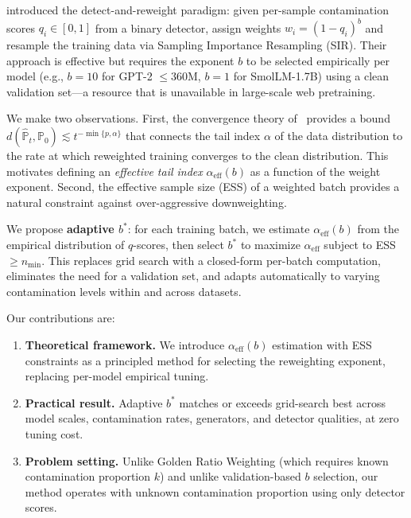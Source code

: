 \documentclass[11pt]{article}
\begin{document}
\citet{drayson2025contamination} introduced the detect-and-reweight paradigm: given per-sample contamination scores $q_i \in [0,1]$ from a binary detector, assign weights $w_i = (1-q_i)^b$ and resample the training data via Sampling Importance Resampling (SIR). Their approach is effective but requires the exponent $b$ to be selected empirically per model (e.g., $b=10$ for GPT-2 $\leq$360M, $b=1$ for SmolLM-1.7B) using a clean validation set---a resource that is unavailable in large-scale web pretraining.

We make two observations. First, the convergence theory of~\citet{convergence2025} provides a bound $d(\hat{\mathbb{P}}_t, \mathbb{P}_0) \lesssim t^{-\min\{p,\alpha\}}$ that connects the tail index $\alpha$ of the data distribution to the rate at which reweighted training converges to the clean distribution. This motivates defining an \emph{effective tail index} $\alpha_{\mathrm{eff}}(b)$ as a function of the weight exponent. Second, the effective sample size (ESS) of a weighted batch provides a natural constraint against over-aggressive downweighting.

We propose \textbf{adaptive $b^*$}: for each training batch, we estimate $\alpha_{\mathrm{eff}}(b)$ from the empirical distribution of $q$-scores, then select $b^*$ to maximize $\alpha_{\mathrm{eff}}$ subject to ESS $\geq n_{\min}$. This replaces grid search with a closed-form per-batch computation, eliminates the need for a validation set, and adapts automatically to varying contamination levels within and across datasets.

Our contributions are:
\begin{enumerate}
    \item \textbf{Theoretical framework.} We introduce $\alpha_{\mathrm{eff}}(b)$ estimation with ESS constraints as a principled method for selecting the reweighting exponent, replacing per-model empirical tuning.
    \item \textbf{Practical result.} Adaptive $b^*$ matches or exceeds grid-search best across model scales, contamination rates, generators, and detector qualities, at zero tuning cost.
    \item \textbf{Problem setting.} Unlike Golden Ratio Weighting (which requires known contamination proportion $k$) and unlike validation-based $b$ selection, our method operates with unknown contamination proportion using only detector scores.
\end{enumerate}

\end{document}
